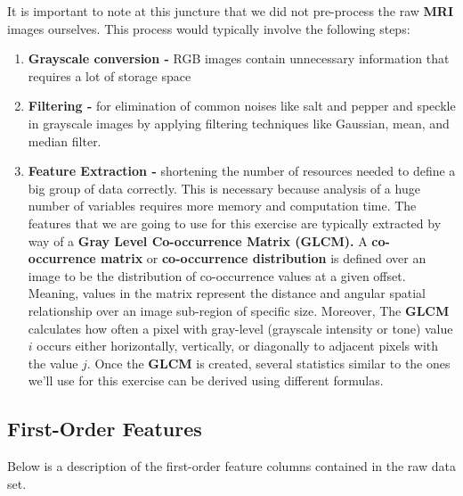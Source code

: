 \documentclass{article}
\begin{document}
It is important to note at this juncture that we did not pre-process the raw \textbf{MRI} images ourselves. This process would typically involve the following steps:
\begin{enumerate}
    \item \textbf{Grayscale conversion -} RGB images contain unnecessary information that requires a lot of storage space
    \item \textbf{Filtering -} for elimination of common noises like salt and pepper and speckle in grayscale images by applying filtering techniques like Gaussian, mean, and median filter.
    \item \textbf{Feature Extraction -} shortening the number of resources needed to define a big group of data correctly. This is necessary because analysis of a huge number of variables requires more memory and computation time. The features that we are going to use for this exercise are typically extracted by way of a \textbf{Gray Level Co-occurrence Matrix (GLCM).} A \textbf{co-occurrence matrix} or \textbf{co-occurrence distribution} is defined over an image to be the distribution of co-occurrence values at a given offset. Meaning, values in the matrix represent the distance and angular spatial relationship over an image sub-region of specific size. Moreover, The \textbf{GLCM} calculates how often a pixel with gray-level (grayscale intensity or tone) value $i$ occurs either horizontally, vertically, or diagonally to adjacent pixels with the value $j$. Once the \textbf{GLCM} is created, several statistics similar to the ones we'll use for this exercise can be derived using different formulas.
\end{enumerate}

\subsection{First-Order Features}
Below is a description of the first-order feature columns contained in the raw data set.
\end{document}
